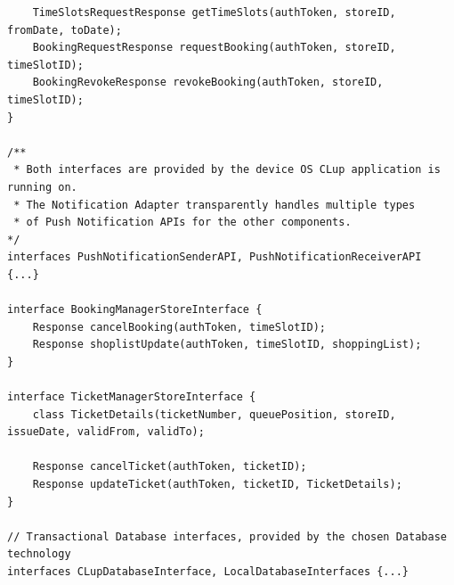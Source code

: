 \begin{lstlisting}
    TimeSlotsRequestResponse getTimeSlots(authToken, storeID, fromDate, toDate);
    BookingRequestResponse requestBooking(authToken, storeID, timeSlotID);
    BookingRevokeResponse revokeBooking(authToken, storeID, timeSlotID);
}

/** 
 * Both interfaces are provided by the device OS CLup application is running on.
 * The Notification Adapter transparently handles multiple types 
 * of Push Notification APIs for the other components.
*/
interfaces PushNotificationSenderAPI, PushNotificationReceiverAPI {...}

interface BookingManagerStoreInterface {
    Response cancelBooking(authToken, timeSlotID);
    Response shoplistUpdate(authToken, timeSlotID, shoppingList);
}

interface TicketManagerStoreInterface {
    class TicketDetails(ticketNumber, queuePosition, storeID, issueDate, validFrom, validTo);

    Response cancelTicket(authToken, ticketID);
    Response updateTicket(authToken, ticketID, TicketDetails);
}

// Transactional Database interfaces, provided by the chosen Database technology
interfaces CLupDatabaseInterface, LocalDatabaseInterfaces {...}

\end{lstlisting}
\clearpage
